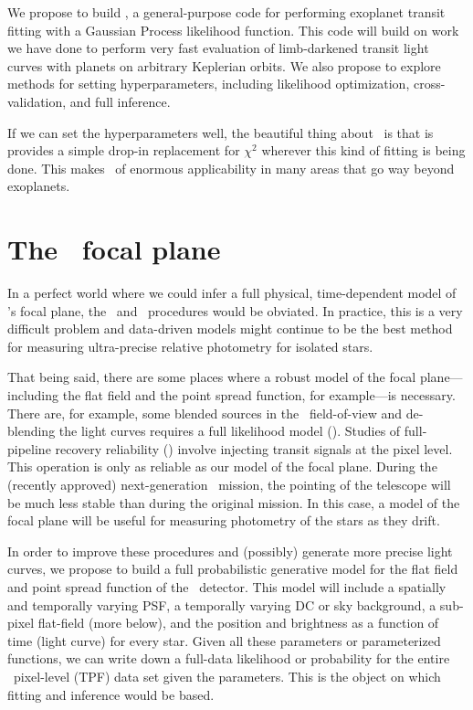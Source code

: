 \documentclass[letterpaper,12pt,preprint]{hack_aastex}
\begin{document}
We propose to build \George,
a general-purpose code for performing exoplanet transit
fitting with a Gaussian Process likelihood function.
This code will build on work we have done to perform very fast evaluation
of limb-darkened transit light curves with planets on arbitrary Keplerian
orbits.
We also propose to explore methods for setting hyperparameters,
including likelihood optimization, cross-validation, and full inference.

If we can set the hyperparameters well, the beautiful thing about \George\ is
that is provides a simple drop-in replacement for $\chi^2$ wherever this kind
of fitting is being done.
This makes \George\ of enormous applicability in many areas that go way beyond
exoplanets.

\section{The \Kepler\ focal plane}

In a perfect world where we could infer a full physical, time-dependent model
of \Kepler's focal plane, the \PLM\ and \OWL\ procedures would be obviated.
In practice, this is a very difficult problem and data-driven models might
continue to be the best method for measuring ultra-precise relative photometry
for isolated stars.

That being said, there are some places where a robust model of the focal
plane---including the flat field and the point spread function, for
example---is necessary.
There are, for example, some blended sources in the \Kepler\ field-of-view and
de-blending the light curves requires a full likelihood model (\citealt{psf}).
Studies of full-pipeline recovery reliability (\citealt{inject}) involve
injecting transit signals at the pixel level.
This operation is only as reliable as our model of the focal plane.
During the (recently approved) next-generation \Kepler\ mission, the pointing
of the telescope will be much less stable than during the original mission.
In this case, a model of the focal plane will be useful for measuring
photometry of the stars as they drift.

In order to improve these procedures and (possibly) generate more precise
light curves, we propose to build a full probabilistic generative model for
the flat field and point spread function of the \Kepler\ detector.
This model will include a spatially and temporally varying PSF,
a temporally varying DC or sky background,
a sub-pixel flat-field (more below),
and the position and brightness as a function of time (light curve) for every
star.
Given all these parameters or parameterized functions, we can write down a
full-data likelihood or probability for the entire \Kepler\ pixel-level (TPF)
data set given the parameters.
This is the object on which fitting and inference would be based.
\end{document}
